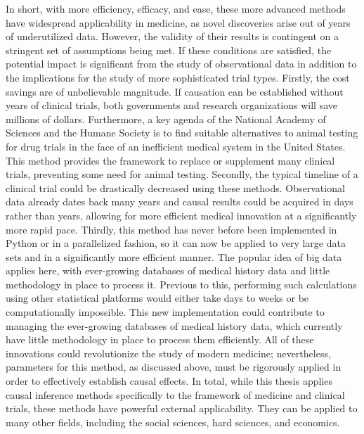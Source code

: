 In short, with more efficiency, efficacy, and ease, these more advanced methods have widespread applicability in medicine, as novel discoveries arise out of years of underutilized data.  However, the validity of their results is contingent on a stringent set of assumptions being met.  If these conditions are satisfied, the potential impact is significant from the study of observational data in addition to the implications for the study of more sophisticated trial types.  Firstly, the cost savings are of unbelievable magnitude.  If causation can be established without years of clinical trials, both governments and research organizations will save millions of dollars.  Furthermore, a key agenda of the National Academy of Sciences and the Humane Society is to find suitable alternatives to animal testing for drug trials in the face of an inefficient medical system in the United States.\cite{dzauvital, avoidinganimaltesting}   This method provides the framework to replace or supplement many clinical trials, preventing some need for animal testing.  Secondly, the typical timeline of a clinical trial could be drastically decreased using these methods.  Observational data already dates back many years and causal results could be acquired in days rather than years, allowing for more efficient medical innovation at a significantly more rapid pace.  Thirdly, this method has never before been implemented in Python or in a parallelized fashion, so it can now be applied to very large data sets and in a significantly more efficient manner.  The popular idea of big data applies here, with ever-growing databases of medical history data and little methodology in place to process it.  Previous to this, performing such calculations using other statistical platforms would either take days to weeks or be computationally impossible. This new implementation could contribute to managing the ever-growing databases of medical history data, which currently have little methodology in place to process them efficiently.  All of these innovations could revolutionize the study of modern medicine; nevertheless, parameters for this method, as discussed above, must be rigorously applied in order to effectively establish causal effects.  In total, while this thesis applies causal inference methods specifically to the framework of medicine and clinical trials, these methods have powerful external applicability. They can be applied to many other fields, including the social sciences, hard sciences, and economics.  



